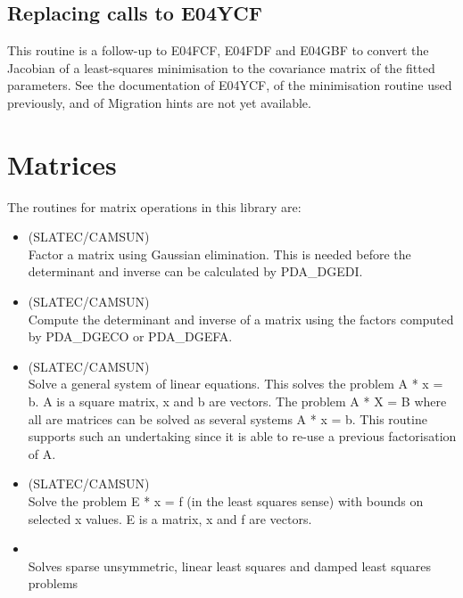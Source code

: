 
\subsection{Replacing calls to E04YCF}

   This routine is a follow-up to E04FCF, E04FDF and E04GBF to convert
   the Jacobian of a least-squares minimisation to the covariance matrix
   of the fitted parameters.
   See the documentation of E04YCF, of the minimisation routine used
   previously, and of
   Migration hints are not yet available.


\section{Matrices}

   The routines for matrix operations in this library are:

\begin{itemize}

\item {} (SLATEC/CAMSUN)\ \\
   Factor a matrix using Gaussian elimination. This is needed before
   the determinant and inverse can be calculated by PDA\_DGEDI.
\item {} (SLATEC/CAMSUN)\ \\
   Compute the determinant and inverse of a matrix using the factors
   computed by PDA\_\-DGECO or PDA\_DGEFA.
\item {} (SLATEC/CAMSUN)\ \\
   Solve a general system of linear equations. This solves the
   problem A * x = b. A is a square matrix, x and b are vectors. The
   problem A * X = B where all are matrices can be solved as several
   systems A * x = b. This routine supports such an undertaking since
   it is able to re-use a previous factorisation of A.
\item {} (SLATEC/CAMSUN)\ \\
   Solve the problem E * x = f (in the least squares sense) with
   bounds on selected x values. E is a matrix, x and f are vectors.
\item {} \\
   Solves sparse unsymmetric, linear least squares and damped least
   squares problems

\end{itemize}

